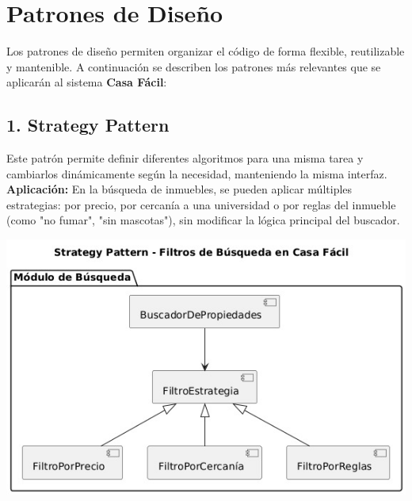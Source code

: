 \section{Patrones de Diseño}
	\noindent Los patrones de diseño permiten organizar el código de forma flexible, reutilizable y mantenible. A continuación se describen los patrones más relevantes que se aplicarán al sistema \textbf{Casa Fácil}:
	
	\subsection*{1. Strategy Pattern}
		\noindent Este patrón permite definir diferentes algoritmos para una misma tarea y cambiarlos dinámicamente según la necesidad, manteniendo la misma interfaz.  
		\textbf{Aplicación:} En la búsqueda de inmuebles, se pueden aplicar múltiples estrategias: por precio, por cercanía a una universidad o por reglas del inmueble (como "no fumar", "sin mascotas"), sin modificar la lógica principal del buscador.
		\begin{center}
			\includegraphics[width=\linewidth]{figures/patterns/strategy.jpg}
			\label{fig:img9}
		\end{center}
	
